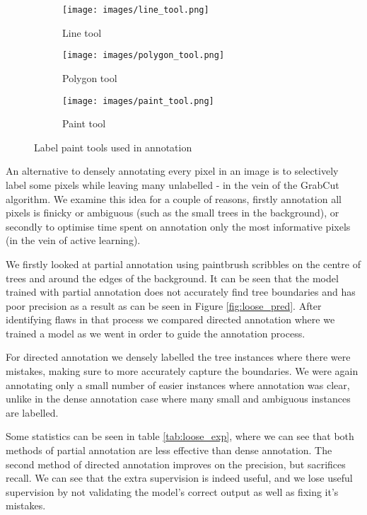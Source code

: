 \documentclass{IEEEtran}
\begin{document}
\begin{figure}
\centering
\begin{subfigure}[t]{.15\textwidth}
  \centering
  \texttt{[image: images/line\_tool.png]}
  \caption{Line tool}
\end{subfigure}%
\begin{subfigure}[t]{.15\textwidth}
  \centering
  \texttt{[image: images/polygon\_tool.png]}
  \caption{Polygon tool}
\end{subfigure}%
\begin{subfigure}[t]{.15\textwidth}
  \centering
  \texttt{[image: images/paint\_tool.png]}
  \caption{Paint tool}
\end{subfigure}%

  \caption{Label paint tools used in annotation}
  \label{fig:tools}

\end{figure}



An alternative to densely annotating every pixel in an image is to selectively label some pixels while leaving many unlabelled - in the vein of the GrabCut algorithm. We examine this idea for a couple of reasons, firstly annotation all pixels is finicky or ambiguous (such as the small trees in the background), or secondly to optimise time spent on annotation only the most informative pixels (in the vein of active learning).

We firstly looked at partial annotation using paintbrush scribbles on the centre of trees and around the edges of the background. It can be seen that the model trained with partial annotation does not accurately find tree boundaries and has poor precision as a result as can be seen in Figure \ref{fig:loose_pred}. After identifying flaws in that process we compared directed annotation where we trained a model as we went in order to guide the annotation process.

For directed annotation we densely labelled the tree instances where there were mistakes, making sure to more accurately capture the boundaries. We were again annotating only a small number of easier instances where annotation was clear, unlike in the dense annotation case where many small and ambiguous instances are labelled.

Some statistics can be seen in table \ref{tab:loose_exp}, where we can see that both methods of partial annotation are less effective than dense annotation. The second method of directed annotation improves on the precision, but sacrifices recall. We can see that the extra supervision is indeed useful, and we lose useful supervision by not validating the model's correct output as well as fixing it's mistakes.
\end{document}
